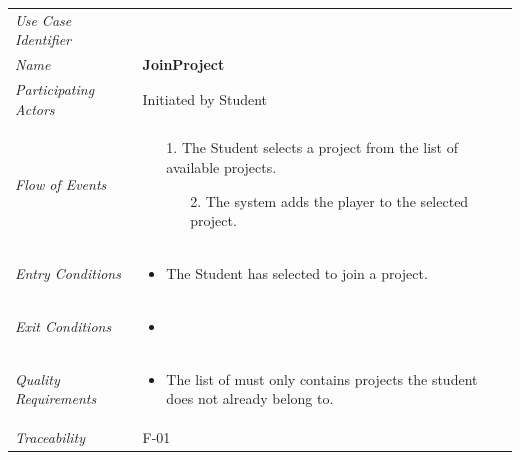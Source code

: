 \documentclass[12pt,letterpaper]{article}
\begin{document}
\begin{center}
	\begin{tabu} to 
		\toprule
		Use Case Identifier & \joinproject{} \\
		Name & {\bf JoinProject} \\
		Participating Actors & Initiated by Student \\
		Flow of Events & 
	    \begin{enumerate}[topsep=-1em, leftmargin=*]
		    \item[1.] The Student selects a project from the list of available projects.
		    \begin{enumerate}
		    		\item[2.] The system adds the player to the selected project.
		    \end{enumerate}
		\end{enumerate} \\

		Entry Conditions &
		\begin{itemize}[topsep=-1em, leftmargin=*]
		    \item The Student has selected to join a project.
        \end{itemize} \\

		Exit Conditions &
		\begin{itemize}[topsep=-1em, leftmargin=*]
		    \item %
        \end{itemize} \\

		Quality Requirements &
		\begin{itemize}[topsep=-1em, leftmargin=*]
		    \item The list of must only contains projects the student does not already belong to.
        \end{itemize} \\

		Traceability & F-01 \\
		\toprule
	\end{tabu}
\end{center}
\end{document}
